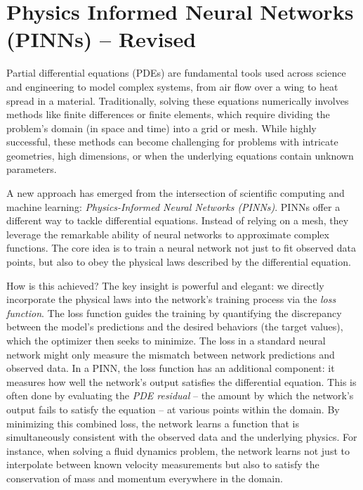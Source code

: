 \chapter{Physics Informed Neural Networks (PINNs) -- Revised}
\label{chap:pinns}

Partial differential equations (PDEs) are fundamental tools used across science and engineering to model complex systems, from air flow over a wing to heat spread in a material. 
Traditionally, solving these equations numerically involves methods like finite differences or finite elements, which require dividing the problem's domain (in space and time) into a grid or mesh. 
While highly successful, these methods can become challenging for problems with intricate geometries, high dimensions, or when the underlying equations contain unknown parameters.

A new approach has emerged from the intersection of scientific computing and machine learning: \emph{Physics-Informed Neural Networks (PINNs)}. 
PINNs offer a different way to tackle differential equations. 
Instead of relying on a mesh, they leverage the remarkable ability of neural networks to approximate complex functions. 
The core idea is to train a neural network not just to fit observed data points, but also to obey the physical laws described by the differential equation.


How is this achieved? The key insight is powerful and elegant: we directly incorporate the physical laws into the network's training process via the \emph{loss function}. 
The loss function guides the training by quantifying the discrepancy between the model's predictions and the desired behaviors (the target values), which the optimizer then seeks to minimize. 
The loss in a standard neural network might only measure the mismatch between network predictions and observed data. 
In a PINN, the loss function has an additional component: it measures how well the network's output satisfies the differential equation. This is often done by evaluating the \emph{PDE residual} – the amount by which the network's output fails to satisfy the equation – at various points within the domain. 
By minimizing this combined loss, the network learns a function that is simultaneously consistent with the observed data and the underlying physics. 
For instance, when solving a fluid dynamics problem, the network learns not just to interpolate between known velocity measurements but also to satisfy the conservation of mass and momentum everywhere in the domain.

